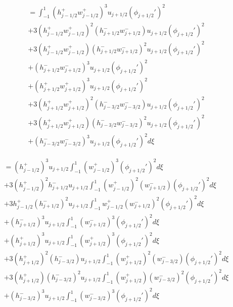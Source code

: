 \documentclass[12pt]{article}
\begin{document}
\begin{multline}
 = \int_{-1}^{1}\left(h^+_{j- 1/2}w^+_{j - 1/2}\right)^3u_{j+1/2}\left(\phi_{j+1/2}'\right)^2 \\ + 3 \left(h^+_{j- 1/2}w^+_{j - 1/2}\right)^2\left(h^-_{j+ 1/2}w^-_{j + 1/2}\right)u_{j+1/2}\left(\phi_{j+1/2}'\right)^2 \\ + 3\left(h^+_{j- 1/2}w^+_{j - 1/2}\right)\left(h^-_{j+ 1/2}w^-_{j + 1/2}\right)^2u_{j+1/2}\left(\phi_{j+1/2}'\right)^2 \\ +\left(h^-_{j+ 1/2}w^-_{j + 1/2}\right)^3u_{j+1/2}\left(\phi_{j+1/2}'\right)^2  \\ + \left(h^+_{j+ 1/2}w^+_{j + 1/2}\right)^3u_{j+1/2}\left(\phi_{j+1/2}'\right)^2 \\ + 3\left(h^+_{j+ 1/2}w^+_{j + 1/2}\right)^2\left(h^-_{j- 3/2}w^-_{j - 3/2}\right)u_{j+1/2}\left(\phi_{j+1/2}'\right)^2 \\ + 3\left(h^+_{j+ 1/2}w^+_{j + 1/2}\right) \left(h^-_{j- 3/2}w^-_{j - 3/2}\right)^2u_{j+1/2}\left(\phi_{j+1/2}'\right)^2\\ + \left(h^-_{j- 3/2}w^-_{j - 3/2}\right)^3  u_{j+1/2}\left(\phi_{j+1/2}'\right)^2 d\xi
\end{multline}

\begin{multline}
 = \left(h^+_{j- 1/2}\right)^3u_{j+1/2} \int_{-1}^{1}\left(w^+_{j - 1/2}\right)^3\left(\phi_{j+1/2}'\right)^2 d\xi \\ + 3\left(h^+_{j- 1/2}\right)^2h^-_{j+ 1/2} u_{j+1/2} \int_{-1}^{1} \left(w^+_{j - 1/2}\right)^2\left(w^-_{j + 1/2}\right)\left(\phi_{j+1/2}'\right)^2 d\xi \\ + 3h^+_{j- 1/2}\left(h^-_{j+ 1/2}\right)^2 u_{j+1/2} \int_{-1}^{1}w^+_{j - 1/2}\left(w^-_{j + 1/2}\right)^2 \left(\phi_{j+1/2}'\right)^2 d\xi \\ + \left(h^-_{j+ 1/2}\right)^3  u_{j+1/2} \int_{-1}^{1} \left(w^-_{j +1/2}\right)^3\left(\phi_{j+1/2}'\right)^2 d\xi  \\ +\left(h^+_{j+ 1/2}\right)^3u_{j+1/2} \int_{-1}^{1} \left(w^+_{j +1/2}\right)^3\left(\phi_{j+1/2}'\right)^2 d\xi\\ + 3\left(h^+_{j+ 1/2}\right)^2\left(h^-_{j- 3/2}\right)u_{j+1/2} \int_{-1}^{1} \left(w^+_{j + 1/2}\right)^2\left(w^-_{j - 3/2}\right)\left(\phi_{j+1/2}'\right)^2 d\xi \\ + 3\left(h^+_{j+ 1/2}\right) \left(h^-_{j- 3/2}\right)^2u_{j+1/2} \int_{-1}^{1}\left(w^+_{j + 1/2}\right) \left(w^-_{j - 3/2}\right)^2\left(\phi_{j+1/2}'\right)^2 d\xi\\ +\left(h^-_{j- 3/2}\right)^3  u_{j+1/2} \int_{-1}^{1}\left(w^-_{j - 3/2}\right)^3  \left(\phi_{j+1/2}'\right)^2  d\xi
\end{multline}
\end{document}
